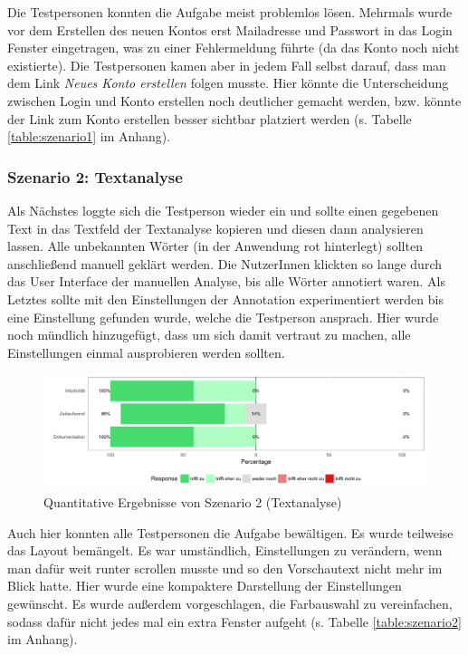 Die Testpersonen konnten die Aufgabe meist problemlos lösen. Mehrmals wurde vor dem Erstellen des neuen Kontos erst Mailadresse und Passwort in das Login Fenster eingetragen, was zu einer Fehlermeldung führte (da das Konto noch nicht existierte). Die Testpersonen kamen aber in jedem Fall selbst darauf, dass man dem Link \textit{Neues Konto erstellen} folgen musste. Hier könnte die Unterscheidung zwischen Login und Konto erstellen noch deutlicher gemacht werden, bzw. könnte der Link zum Konto erstellen besser sichtbar platziert werden (s. Tabelle \ref{table:szenario1} im Anhang).

\subsubsection{Szenario 2: Textanalyse}

Als Nächstes loggte sich die Testperson wieder ein und sollte einen gegebenen Text in das Textfeld der Textanalyse kopieren und diesen dann analysieren lassen. Alle unbekannten Wörter (in der Anwendung rot hinterlegt) sollten anschließend manuell geklärt werden. Die NutzerInnen klickten so lange durch das User Interface der manuellen Analyse, bis alle Wörter annotiert waren. Als Letztes sollte mit den Einstellungen der Annotation experimentiert werden bis eine Einstellung gefunden wurde, welche die Testperson ansprach. Hier wurde noch mündlich hinzugefügt, dass um sich damit vertraut zu machen, alle Einstellungen einmal ausprobieren werden sollten.

\begin{figure}[h!]
	\centering
	\includegraphics[width=.8\linewidth]{figures/evaluation/scenario2}
	\caption{Quantitative Ergebnisse von Szenario 2 (Textanalyse)}
	\label{fig:evaluation-sc2}
\end{figure}

Auch hier konnten alle Testpersonen die Aufgabe bewältigen. Es wurde teilweise das Layout bemängelt. Es war umständlich, Einstellungen zu verändern, wenn man dafür weit runter scrollen musste und so den Vorschautext nicht mehr im Blick hatte. Hier wurde eine kompaktere Darstellung der Einstellungen gewünscht. Es wurde außerdem vorgeschlagen, die Farbauswahl zu vereinfachen, sodass dafür nicht jedes mal ein extra Fenster aufgeht (s. Tabelle \ref{table:szenario2} im Anhang).

